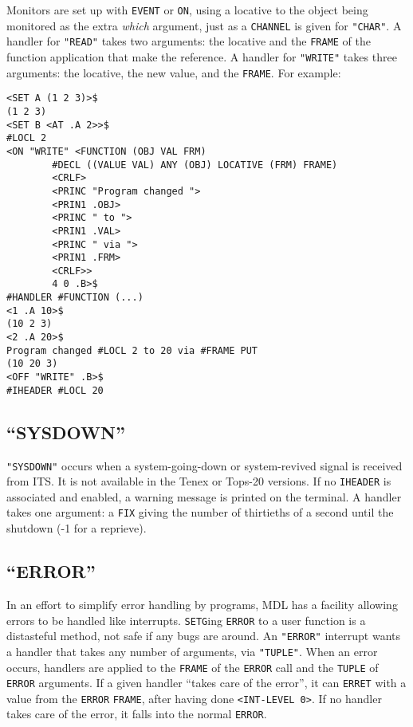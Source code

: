 \documentclass[a4paper]{scrbook}
\begin{document}
Monitors are set up with \texttt{EVENT} or \texttt{ON}, using a locative to the object being monitored as the extra
\emph{which} argument, just as a \texttt{CHANNEL} is given for \texttt{"CHAR"}. A handler for \texttt{"READ"} takes two
arguments: the locative and the \texttt{FRAME} of the function application that make the reference. A handler for
\texttt{"WRITE"} takes three arguments: the locative, the new value, and the \texttt{FRAME}. For example:

\begin{verbatim}
<SET A (1 2 3)>$
(1 2 3)
<SET B <AT .A 2>>$
#LOCL 2
<ON "WRITE" <FUNCTION (OBJ VAL FRM)
        #DECL ((VALUE VAL) ANY (OBJ) LOCATIVE (FRM) FRAME)
        <CRLF>
        <PRINC "Program changed ">
        <PRIN1 .OBJ>
        <PRINC " to ">
        <PRIN1 .VAL>
        <PRINC " via ">
        <PRIN1 .FRM>
        <CRLF>>
        4 0 .B>$
#HANDLER #FUNCTION (...)
<1 .A 10>$
(10 2 3)
<2 .A 20>$
Program changed #LOCL 2 to 20 via #FRAME PUT
(10 20 3)
<OFF "WRITE" .B>$
#IHEADER #LOCL 20
\end{verbatim}

\subsection{\texorpdfstring{``SYSDOWN''}{21.8.10. SYSDOWN}}\label{sysdown}

\texttt{"SYSDOWN"}  occurs when a system-going-down or system-revived signal is received
from ITS. It is not available in the Tenex or Tops-20
versions. If no \texttt{IHEADER} is associated and enabled, a warning message is printed on the terminal. A handler takes
one argument: a \texttt{FIX} giving the number of thirtieths of a second until the shutdown (-1 for a reprieve).

\subsection{\texorpdfstring{``ERROR''}{21.8.11. ERROR}}\label{error-1}

 In an effort to simplify error handling by programs, MDL has a facility allowing errors
to be handled like interrupts. \texttt{SETG}ing \texttt{ERROR} to a user function is a distasteful method, not safe if any
bugs are around. An \texttt{"ERROR"} interrupt wants a handler that takes any number of arguments, via \texttt{"TUPLE"}.
When an error occurs, handlers are applied to the \texttt{FRAME} of the \texttt{ERROR} call and the \texttt{TUPLE} of
\texttt{ERROR} arguments. If a given handler ``takes care of the error'', it can \texttt{ERRET} with a value from the
\texttt{ERROR} \texttt{FRAME}, after having done \texttt{\textless{}INT-LEVEL\ 0\textgreater{}}. If no handler takes care
of the error, it falls into the normal \texttt{ERROR}.
\end{document}
